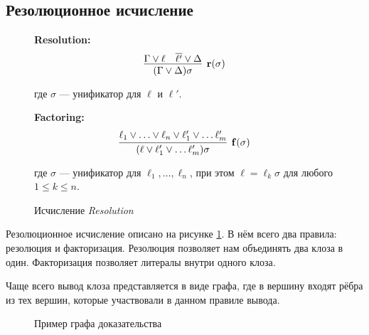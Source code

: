 \subsection{Резолюционное исчисление}
\begin{figure}
\begin{calculus}
\centering
\textbf{Resolution:}
$$
\infer[\mathbf{r}(\sigma)]
	  {(\Gamma \vee \Delta)\sigma}
      {\Gamma \vee \ell & \overline{\ell'} \vee \Delta}
$$

где $\sigma$ --- унификатор для $\ell$ и $\ell'$.

\bigskip

\textbf{Factoring:}
$$
\infer[\mathbf{f}(\sigma)]
      {(\ell \vee \ell'_1 \vee \ldots \ell'_m)\sigma}
      {\ell_1 \vee \ldots \vee \ell_n \vee \ell'_1 \vee \ldots \ell'_m}
$$

где $\sigma$ --- унификатор для $\ell_1, \ldots, \ell_n$, при этом $\ell = \ell_k \sigma$ для любого $1 \leq k \leq n$.
\end{calculus}
\caption{Исчисление \emph{Resolution}}
\label{fig:R}
\end{figure}

Резолюционное исчисление описано на рисунке \ref{fig:R}. В нём всего два правила: резолюция и факторизация. Резолюция позволяет нам объединять два клоза в один. Факторизация позволяет  литералы внутри одного клоза.

Чаще всего вывод клоза представляется в виде графа, где в вершину входят рёбра из тех вершин, которые участвовали в данном правиле вывода. 

\usetikzlibrary{arrows.meta}
\begin{figure}
\caption{Пример графа доказательства}
\label{fig:graph-example}
\end{figure}

